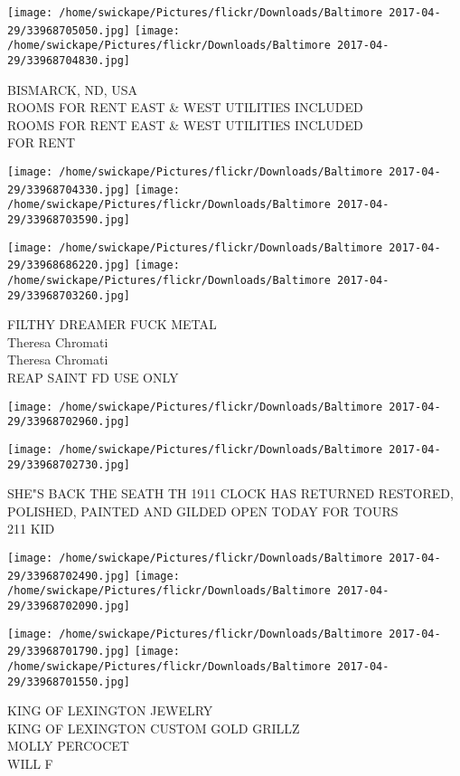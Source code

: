 \documentclass[10pt,letterpaper]{article}
\begin{document}
\texttt{[image: /home/swickape/Pictures/flickr/Downloads/Baltimore 2017-04-29/33968705050.jpg]}
\texttt{[image: /home/swickape/Pictures/flickr/Downloads/Baltimore 2017-04-29/33968704830.jpg]}

BISMARCK, ND, USA\\
ROOMS FOR RENT EAST \& WEST UTILITIES INCLUDED\\
ROOMS FOR RENT EAST \& WEST UTILITIES INCLUDED\\
FOR RENT\\
\pagebreak

\texttt{[image: /home/swickape/Pictures/flickr/Downloads/Baltimore 2017-04-29/33968704330.jpg]}
\texttt{[image: /home/swickape/Pictures/flickr/Downloads/Baltimore 2017-04-29/33968703590.jpg]}

\texttt{[image: /home/swickape/Pictures/flickr/Downloads/Baltimore 2017-04-29/33968686220.jpg]}
\texttt{[image: /home/swickape/Pictures/flickr/Downloads/Baltimore 2017-04-29/33968703260.jpg]}

FILTHY DREAMER FUCK METAL\\
Theresa Chromati\\
Theresa Chromati\\
REAP SAINT FD USE ONLY\\
\pagebreak

\texttt{[image: /home/swickape/Pictures/flickr/Downloads/Baltimore 2017-04-29/33968702960.jpg]}

\vspace{0.25in}
\texttt{[image: /home/swickape/Pictures/flickr/Downloads/Baltimore 2017-04-29/33968702730.jpg]}

SHE"S BACK THE SEATH TH 1911 CLOCK HAS RETURNED RESTORED, POLISHED, PAINTED AND GILDED OPEN TODAY FOR TOURS\\
211 KID\\
\pagebreak

\texttt{[image: /home/swickape/Pictures/flickr/Downloads/Baltimore 2017-04-29/33968702490.jpg]}
\texttt{[image: /home/swickape/Pictures/flickr/Downloads/Baltimore 2017-04-29/33968702090.jpg]}

\texttt{[image: /home/swickape/Pictures/flickr/Downloads/Baltimore 2017-04-29/33968701790.jpg]}
\texttt{[image: /home/swickape/Pictures/flickr/Downloads/Baltimore 2017-04-29/33968701550.jpg]}

KING OF LEXINGTON JEWELRY\\
KING OF LEXINGTON CUSTOM GOLD GRILLZ\\
MOLLY PERCOCET\\
WILL F\\
\pagebreak
\end{document}
